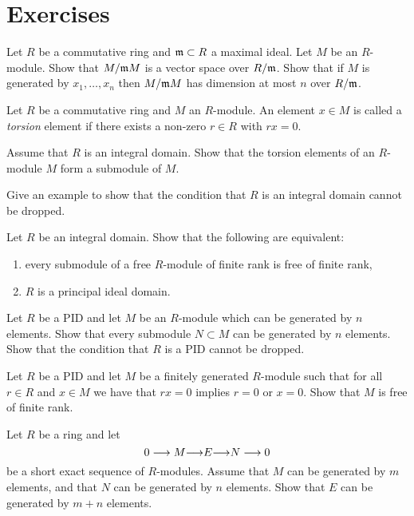 \newpage
\section*{Exercises}

\begin{exercise}Let $R$ be a commutative ring and ${\mathfrak{m}} \subset R$ a maximal ideal. 
Let $M$ be an $R$-module. Show that $M/{\mathfrak{m}} M$ is a vector space over $R/{\mathfrak{m}}$. Show that if $M$ is generated by $x_1,\ldots, x_n$ then $M/{\mathfrak{m}} M$ has dimension at most $n$ over $R/{\mathfrak{m}}$.
\end{exercise}

\begin{exercise}\label{ex:torsion-not-submodule}
Let $R$ be a commutative ring and $M$ an $R$-module. An element $x\in M$ is called a \emph{torsion} element if there exists a non-zero $r\in R$ with $rx=0$. 

Assume that $R$ is an integral domain. Show that the torsion elements of an $R$-module $M$ form a submodule of $M$. 

Give an example to show that the condition that $R$ is an integral domain cannot be dropped.
\end{exercise}

\begin{exercise}\label{exc:non-free-submodule}
Let $R$ be an integral domain. Show that the following are equivalent:
\begin{enumerate}
\item every submodule of a free $R$-module of finite rank is free of finite rank,
\item $R$ is a principal ideal domain.
\end{enumerate}
\end{exercise}


\begin{exercise}
Let $R$ be a PID and let $M$ be an $R$-module which can be generated by $n$ elements. Show that every submodule $N\subset M$ can be generated by $n$ elements. Show that the condition that $R$ is a PID cannot be dropped.
\end{exercise}

\begin{exercise}
Let $R$ be a PID and let $M$ be a finitely generated $R$-module such that for all $r\in R$ and $x\in M$ we have that $rx=0$ implies $r=0$ or $x=0$. Show that $M$ is free of finite rank.
\end{exercise}

\begin{exercise}
Let $R$ be a ring and let 
\[
	0 \longrightarrow M {\longrightarrow} E {\longrightarrow} N \longrightarrow 0
\]
be a short exact sequence of $R$-modules. Assume that $M$ can be generated by $m$ elements, and that $N$ can be generated by $n$ elements. Show that $E$ can be generated by $m+n$ elements.
\end{exercise}

